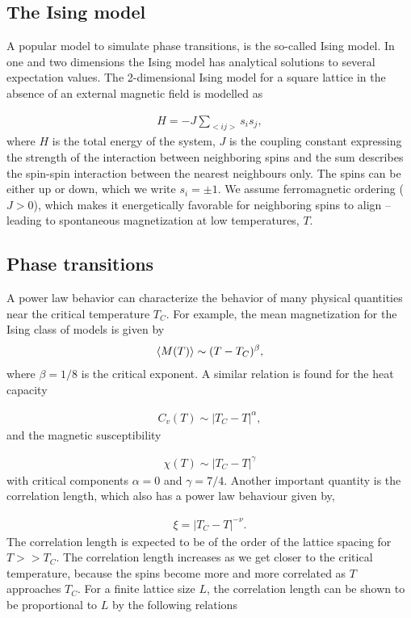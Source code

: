 \documentclass[../main.tex]{subfiles}
\begin{document}
\subsection{The Ising model}
A popular model to simulate phase transitions, is the so-called Ising model. In one and two dimensions the Ising model has analytical solutions to several expectation values. The 2-dimensional Ising model for a square lattice in the absence of an external magnetic field is modelled as 

\begin{align}
    H = -J\sum_{<ij>}s_is_j,
\end{align} where $H$ is the total energy of the system, $J$ is the coupling constant expressing the strength of the interaction between neighboring spins and the sum describes the spin-spin interaction between the nearest neighbours only. The spins can be either up or down, which we write $s_i=\pm1$. We assume ferromagnetic ordering ($J>0$), which makes it energetically favorable for neighboring spins to align -- leading to spontaneous magnetization at low temperatures, $T$.



\subsection{Phase transitions}
A power law behavior can characterize the behavior of many physical quantities near the critical temperature $T_C$. For example, the mean magnetization for the Ising class of models is given by
\begin{align}
    \braket{M(T)}\sim(T-T_C)^\beta,
\end{align} where $\beta=1/8$ is the critical exponent. A similar relation is found for the heat capacity

\begin{align}
    C_v(T)\sim|T_C-T|^\alpha, 
\end{align} and the magnetic susceptibility

\begin{align}
    \chi(T)\sim|T_C-T|^\gamma
\end{align} with critical components $\alpha=0$ and $\gamma=7/4$. Another important quantity is the correlation length, which also has a power law behaviour given by,

\begin{align}
    \xi=|T_C-T|^{-\nu}.
    \label{eq:xi}
\end{align} The correlation length is expected to be of the order of the lattice spacing for $T>>T_C$. The correlation length increases as we get closer to the critical temperature, because the spins become more and more correlated as $T$ approaches $T_C$. For a finite lattice size $L$, the correlation length can be shown to be proportional to $L$ by the following relations
\end{document}
